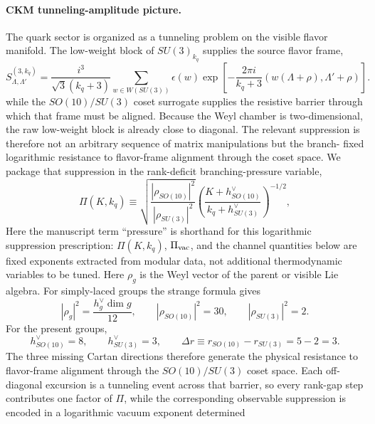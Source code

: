 \documentclass[11pt]{article}
\begin{document}
\paragraph{CKM tunneling-amplitude picture.}
The quark sector is organized as a tunneling problem on the visible flavor
manifold. The low-weight block of $SU(3)_{k_q}$ supplies the source flavor
frame,
\begin{equation}
 S^{(3,k_q)}_{\Lambda,\Lambda'}
 = \frac{i^3}{\sqrt3(k_q+3)}
 \sum_{w\in W(SU(3))}\epsilon(w)
 \exp\!\left[-\frac{2\pi i}{k_q+3}(w(\Lambda+\rho),\Lambda'+\rho)\right].
\end{equation}
while the $SO(10)/SU(3)$ coset surrogate supplies the resistive barrier through
which that frame must be aligned. Because the Weyl chamber is two-dimensional,
the raw low-weight block is already close to diagonal. The relevant suppression
is therefore not an arbitrary sequence of matrix manipulations but the branch-
fixed logarithmic resistance to flavor-frame alignment through the coset space.
We package that suppression in the rank-deficit branching-pressure variable,
\begin{equation}
 \Pi(K,k_q)
 \equiv
 \sqrt{\frac{|\rho_{SO(10)}|^2}{|\rho_{SU(3)}|^2}}
 \left(\frac{K+h^{\vee}_{SO(10)}}{k_q+h^{\vee}_{SU(3)}}\right)^{-1/2},
 \label{eq:rank-deficit-pressure}
\end{equation}
Here the manuscript term ``pressure'' is shorthand for this logarithmic
suppression prescription: $\Pi(K,k_q)$, $\Pi_{\rm vac}$, and the channel
quantities below are fixed exponents extracted from modular data, not
additional thermodynamic variables to be tuned.
Here $\rho_g$ is the Weyl vector of the parent or visible Lie algebra. For simply-laced groups the strange formula gives
\begin{equation}
 |\rho_g|^2=\frac{h_g^{\vee}\dim g}{12},
 \qquad
 |\rho_{SO(10)}|^2=30,
 \qquad
 |\rho_{SU(3)}|^2=2.
\end{equation}
For the present groups,
\begin{equation}
 h^{\vee}_{SO(10)}=8,
 \qquad
 h^{\vee}_{SU(3)}=3,
 \qquad
 \Delta r \equiv r_{SO(10)}-r_{SU(3)} = 5-2 = 3.
\end{equation}
The three missing Cartan directions therefore generate the physical resistance
to flavor-frame alignment through the $SO(10)/SU(3)$ coset space. Each
off-diagonal excursion is a tunneling event across that barrier, so every
rank-gap step contributes one factor of $\Pi$, while the corresponding
observable suppression is encoded in a logarithmic vacuum exponent determined
\end{document}
